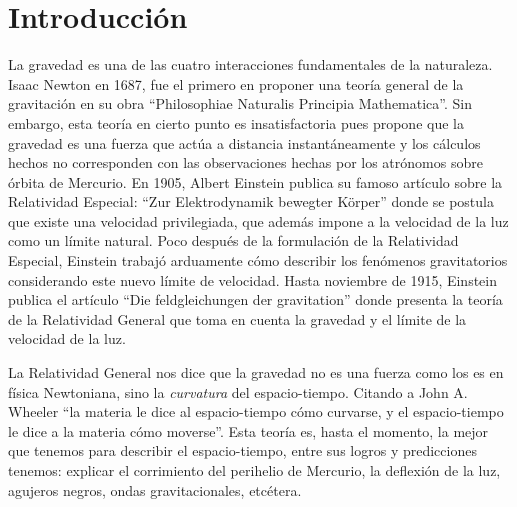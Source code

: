 \documentclass[11pt, letterpaper, spanish]{book}
\theoremstyle{definition}
\theoremstyle{plain}
\theoremstyle{remark}
\theoremstyle{break}
\begin{document}
\printnomenclature
\tableofcontents{}




\chapter*{Introducci\'{o}n}

La gravedad es una de las cuatro interacciones fundamentales de la naturaleza. Isaac Newton en 1687, fue el primero en proponer una teor\'{i}a general de la gravitaci\'{o}n en su obra ``Philosophiae Naturalis Principia Mathematica''. Sin embargo, esta teor\'{i}a en cierto punto es insatisfactoria pues propone que la gravedad es una fuerza que act\'{u}a a distancia instant\'{a}neamente y los c\'{a}lculos hechos no corresponden con las observaciones hechas por los atr\'{o}nomos sobre \'{o}rbita de Mercurio. En 1905, Albert Einstein publica su famoso art\'{i}culo sobre la Relatividad Especial: ``Zur Elektrodynamik bewegter K\"{o}rper'' donde se postula que existe una velocidad privilegiada, que adem\'{a}s impone a la velocidad de la luz como un l\'{i}mite natural. Poco despu\'{e}s de la formulaci\'{o}n de la Relatividad Especial, Einstein trabaj\'{o} arduamente c\'{o}mo describir los fen\'{o}menos gravitatorios considerando este nuevo l\'{i}mite de velocidad. Hasta noviembre de 1915, Einstein publica el art\'{i}culo  ``Die feldgleichungen der gravitation'' \cite{Einstein} donde presenta la teor\'{i}a de la Relatividad General que toma en cuenta la gravedad y el l\'{i}mite de la velocidad de la luz.

La Relatividad General nos dice que la gravedad no es una fuerza como los es en f\'{i}sica Newtoniana, sino la \emph{curvatura} del espacio-tiempo. Citando a John A. Wheeler ``la materia le dice al espacio-tiempo c\'{o}mo curvarse, y el espacio-tiempo le dice a la materia c\'{o}mo moverse''. Esta teor\'{i}a es, hasta el momento, la mejor que tenemos para describir el espacio-tiempo, entre sus logros y predicciones tenemos: explicar el corrimiento del perihelio de Mercurio, la deflexi\'{o}n de la luz, agujeros negros, ondas gravitacionales, etc\'{e}tera.
\end{document}
